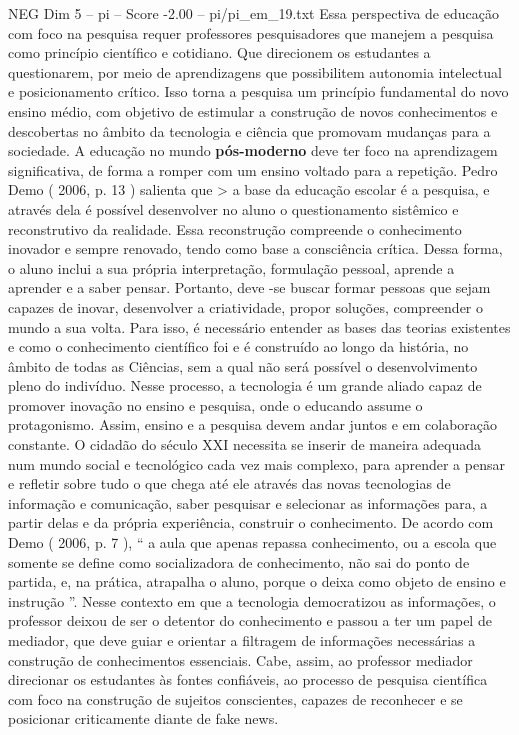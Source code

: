\begin{textsample}{NEG Dim 5 – pi – Score -2.00 – pi/pi\_em\_19.txt}
Essa perspectiva de educação com foco na pesquisa requer professores pesquisadores que manejem a pesquisa como princípio científico e cotidiano.
Que direcionem os estudantes a questionarem, por meio de aprendizagens que possibilitem autonomia intelectual e posicionamento crítico.
Isso torna a pesquisa um princípio fundamental do novo ensino médio, com objetivo de estimular a construção de novos conhecimentos e descobertas no âmbito da tecnologia e ciência que promovam mudanças para a sociedade.
A educação no mundo \textbf{pós-moderno} deve ter foco na aprendizagem significativa, de forma a romper com um ensino voltado para a repetição.
Pedro Demo ( 2006, p. 13 ) salienta que > a base da educação escolar é a pesquisa, e através dela é possível desenvolver no aluno o questionamento sistêmico e reconstrutivo da realidade.
Essa reconstrução compreende o conhecimento inovador e sempre renovado, tendo como base a consciência crítica.
Dessa forma, o aluno inclui a sua própria interpretação, formulação pessoal, aprende a aprender e a saber pensar.
Portanto, deve -se buscar formar pessoas que sejam capazes de inovar, desenvolver a criatividade, propor soluções, compreender o mundo a sua volta.
Para isso, é necessário entender as bases das teorias existentes e como o conhecimento científico foi e é construído ao longo da história, no âmbito de todas as Ciências, sem a qual não será possível o desenvolvimento pleno do indivíduo.
Nesse processo, a tecnologia é um grande aliado capaz de promover inovação no ensino e pesquisa, onde o educando assume o protagonismo.
Assim, ensino e a pesquisa devem andar juntos e em colaboração constante.
O cidadão do século XXI necessita se inserir de maneira adequada num mundo social e tecnológico cada vez mais complexo, para aprender a pensar e refletir sobre tudo o que chega até ele através das novas tecnologias de informação e comunicação, saber pesquisar e selecionar as informações para, a partir delas e da própria experiência, construir o conhecimento.
De acordo com Demo ( 2006, p. 7 ), “ a aula que apenas repassa conhecimento, ou a escola que somente se define como socializadora de conhecimento, não sai do ponto de partida, e, na prática, atrapalha o aluno, porque o deixa como objeto de ensino e instrução ”.
Nesse contexto em que a tecnologia democratizou as informações, o professor deixou de ser o detentor do conhecimento e passou a ter um papel de mediador, que deve guiar e orientar a filtragem de informações necessárias a construção de conhecimentos essenciais.
Cabe, assim, ao professor mediador direcionar os estudantes às fontes confiáveis, ao processo de pesquisa científica com foco na construção de sujeitos conscientes, capazes de reconhecer e se posicionar criticamente diante de fake news.

\end{textsample}
